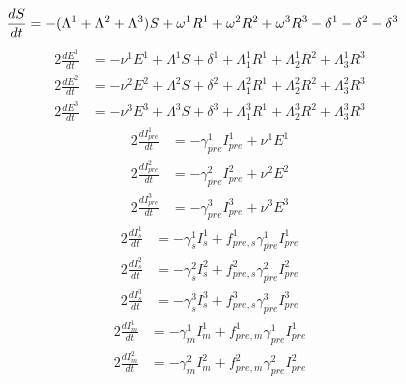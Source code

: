 \documentclass{article}%
\begin{document}
%
\begin{alignat}{2}%
\frac{dS}{dt} &= -( \Lambda^{1} +  \Lambda^{2} +  \Lambda^{3}) \-^{} S +  \omega^{1} R^{1} +  \omega^{2} R^{2} +  \omega^{3} R^{3}  -\delta^{1}  -\delta^{2}  -\delta^{3}%
\end{alignat}%
\begin{alignat}{2}%
\frac{dE^{1}}{dt} &= -\nu^{1} E^{1} +  \Lambda^{1} S +  \delta^{1} +  \Lambda_{1}^{1} R^{1} +  \Lambda_{2}^{1} R^{2} +  \Lambda_{3}^{1} R^{3}%
\end{alignat}%
\begin{alignat}{2}%
\frac{dE^{2}}{dt} &= -\nu^{2} E^{2} +  \Lambda^{2} S +  \delta^{2} +  \Lambda_{1}^{2} R^{1} +  \Lambda_{2}^{2} R^{2} +  \Lambda_{3}^{2} R^{3}%
\end{alignat}%
\begin{alignat}{2}%
\frac{dE^{3}}{dt} &= -\nu^{3} E^{3} +  \Lambda^{3} S +  \delta^{3} +  \Lambda_{1}^{3} R^{1} +  \Lambda_{2}^{3} R^{2} +  \Lambda_{3}^{3} R^{3}%
\end{alignat}%
\begin{alignat}{2}%
\frac{dI_{pre}^{1}}{dt} &= -\gamma_{pre}^{1} I_{pre}^{1} +  \nu^{1} E^{1}%
\end{alignat}%
\begin{alignat}{2}%
\frac{dI_{pre}^{2}}{dt} &= -\gamma_{pre}^{2} I_{pre}^{2} +  \nu^{2} E^{2}%
\end{alignat}%
\begin{alignat}{2}%
\frac{dI_{pre}^{3}}{dt} &= -\gamma_{pre}^{3} I_{pre}^{3} +  \nu^{3} E^{3}%
\end{alignat}%
\begin{alignat}{2}%
\frac{dI_{s}^{1}}{dt} &= -\gamma_{s}^{1} I_{s}^{1} + f_{pre,s}^{1} \gamma_{pre}^{1} I_{pre}^{1}%
\end{alignat}%
\begin{alignat}{2}%
\frac{dI_{s}^{2}}{dt} &= -\gamma_{s}^{2} I_{s}^{2} + f_{pre,s}^{2} \gamma_{pre}^{2} I_{pre}^{2}%
\end{alignat}%
\begin{alignat}{2}%
\frac{dI_{s}^{3}}{dt} &= -\gamma_{s}^{3} I_{s}^{3} + f_{pre,s}^{3} \gamma_{pre}^{3} I_{pre}^{3}%
\end{alignat}%
\begin{alignat}{2}%
\frac{dI_{m}^{1}}{dt} &= -\gamma_{m}^{1} I_{m}^{1} + f_{pre,m}^{1} \gamma_{pre}^{1} I_{pre}^{1}%
\end{alignat}%
\begin{alignat}{2}%
\frac{dI_{m}^{2}}{dt} &= -\gamma_{m}^{2} I_{m}^{2} + f_{pre,m}^{2} \gamma_{pre}^{2} I_{pre}^{2}%
\end{alignat}%
\end{document}
